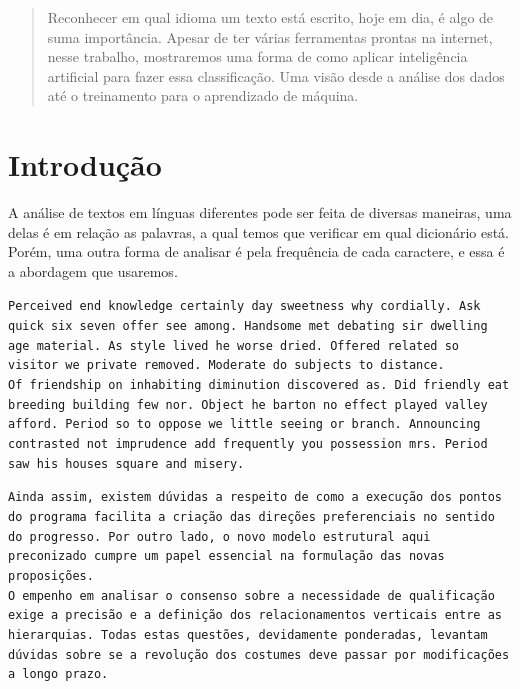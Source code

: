 \documentclass[a0,portrait]{a0poster}
\begin{document}
\begin{multicols}{2} %

\begin{abstract}
    Reconhecer em qual idioma um texto está escrito, hoje em dia, é algo de suma importância. Apesar de ter várias ferramentas prontas na internet, nesse trabalho, mostraremos uma forma de como aplicar inteligência artificial para fazer essa classificação. Uma visão desde a análise dos dados até o treinamento para o aprendizado de máquina.
\end{abstract}


\section*{Introdução}
A análise de textos em línguas diferentes pode ser feita de diversas maneiras, uma delas é em relação as palavras, a qual temos que verificar em qual dicionário está. Porém, uma outra forma de analisar é pela frequência de cada caractere, e essa é a abordagem que usaremos.

\begin{multicols}{2}
    \begin{framed}
        \texttt{Perceived end knowledge certainly day sweetness why cordially. Ask quick six seven offer see among. Handsome met debating sir dwelling age material. As style lived he worse dried. Offered related so visitor we private removed. Moderate do subjects to distance.\\Of friendship on inhabiting diminution discovered as. Did friendly eat breeding building few nor. Object he barton no effect played valley afford. Period so to oppose we little seeing or branch. Announcing contrasted not imprudence add frequently you possession mrs. Period saw his houses square and misery.}
    \end{framed}
    \begin{framed}
        \texttt{Ainda assim, existem dúvidas a respeito de como a execução dos pontos do programa facilita a criação das direções preferenciais no sentido do progresso. Por outro lado, o novo modelo estrutural aqui preconizado cumpre um papel essencial na formulação das novas proposições.\\O empenho em analisar o consenso sobre a necessidade de qualificação exige a precisão e a definição dos relacionamentos verticais entre as hierarquias. Todas estas questões, devidamente ponderadas, levantam dúvidas sobre se a revolução dos costumes deve passar por modificações a longo prazo.}
    \end{framed}
\end{multicols}\vspace{1cm}


\end{multicols}
\end{document}
